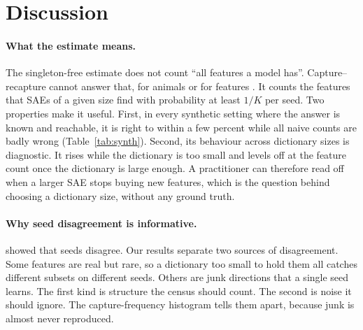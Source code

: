 \section{Discussion}
\label{sec:discussion}

\paragraph{What the estimate means.} The singleton-free estimate does not count ``all features a model has''. Capture--recapture cannot answer that, for animals or for features \citep{link2003nonidentifiability}. It counts the features that SAEs of a given size find with probability at least $1/K$ per seed. Two properties make it useful. First, in every synthetic setting where the answer is known and reachable, it is right to within a few percent while all naive counts are badly wrong (Table~\ref{tab:synth}). Second, its behaviour across dictionary sizes is diagnostic. It rises while the dictionary is too small and levels off at the feature count once the dictionary is large enough. A practitioner can therefore read off when a larger SAE stops buying new features, which is the question behind choosing a dictionary size, without any ground truth.

\paragraph{Why seed disagreement is informative.} \citet{paulo2025sparse} showed that seeds disagree. Our results separate two sources of disagreement. Some features are real but rare, so a dictionary too small to hold them all catches different subsets on different seeds. Others are junk directions that a single seed learns. The first kind is structure the census should count. The second is noise it should ignore. The capture-frequency histogram tells them apart, because junk is almost never reproduced.

